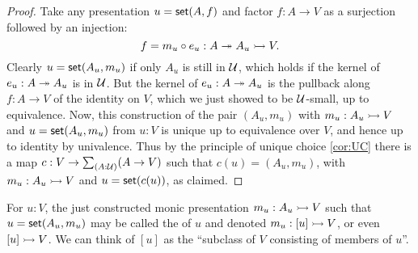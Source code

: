 \begin{proof}
  Take any presentation $u = \mathsf{set}(A,f)$ and factor $f:A\to V$ as a surjection followed by an injection:
  \begin{equation*}
    f = m_u\circ e_u : A \twoheadrightarrow A_u \rightarrowtail V.    
  \end{equation*}
  Clearly $u = \mathsf{set}(A_u, m_u)$ if only $A_u$ is still in $\mathcal{U}$, which holds if the kernel of $e_u : A \twoheadrightarrow A_u$ is in $\mathcal{U}$.  But the kernel of $e_u : A \twoheadrightarrow A_u$ is the pullback along $f : A\to V$ of the identity on $V$, which we just showed to be $\mathcal{U}$-small, up to equivalence.  Now, this construction of the pair $(A_u, m_u)$ with $m_u :A_u \rightarrowtail V$ and $u = \mathsf{set}(A_u, m_u)$ from $u:V$ is unique up to equivalence over $V$, and hence up to identity by univalence.  Thus by the principle of unique choice \eqref{cor:UC} there is a map $c : V\to\sm{A:\UU}(A\to V)$ such that $c(u) = (A_u, m_u)$, with $m_u :A_u \rightarrowtail V$ and $u = \mathsf{set}(c(u))$, as claimed.
\end{proof}

\begin{defn}\label{def:TypeOfElements}
  For $u:V$, the just constructed monic presentation $m_u: A_u \rightarrowtail V$ such that $u = \mathsf{set}(A_u, m_u)$ may be called the 
  of $u$ and denoted $m_u : [u] \rightarrowtail V$, or even $[u] \rightarrowtail V$.  We can think of $[u]$ as the ``subclass of $V$ consisting of members of $u$''.
\end{defn}

